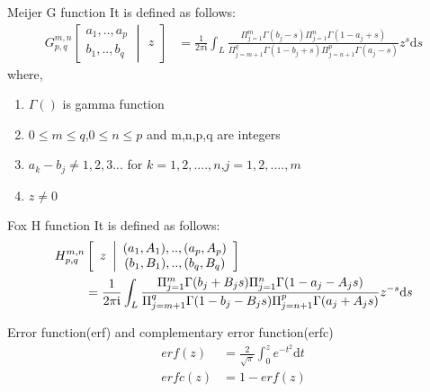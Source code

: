 \documentclass{beamer}
\providecommand{\sbrak}[1]{\ensuremath{{}\left[#1\right]}}
\begin{document}
\begin{frame}
\begin{block}{Meijer G function}
It is defined as follows:
\begin{align}
G^{m,n}_{p,q} \sbrak{\begin{array}{c}
a_1,..,a_p \\
b_1,..,b_q 
\end{array} \middle \vert
\begin{array}{c}
z
\end{array} } &= \frac{1}{2 \pi \mathfrak{i}} \int_L \frac{\Pi_{j=1}^m \Gamma(b_j-s)\Pi_{j=1}^n \Gamma(1-a_j+s)}{\Pi_{j=m+1}^q \Gamma(1-b_j+s)\Pi_{j=n+1}^p \Gamma(a_j-s)} z^s \mathrm{d}s \label{g}
\end{align}
where,
\begin{enumerate}
\item $\Gamma()$ is gamma function
\item $0 \leq m \leq q$,$0 \leq n \leq p$ and m,n,p,q are integers
\item $a_k-b_j \neq 1,2,3...$ for $k=1,2,....,n$,$j=1,2,....,m$
\item $z \neq 0$
\end{enumerate}
\end{block}
\end{frame}




\begin{frame}
\begin{block}{Fox H function}
It is defined as follows:
\begin{align}
H^{m,n}_{p,q} & \sbrak{\begin{array}{c}
z
\end{array} \middle \vert
\begin{array}{c}
(a_1,A_1),..,(a_p,A_p) \\
(b_1,B_1),..,(b_q,B_q) 
\end{array} }   \notag \\ 
 &= \frac{1}{2 \pi \mathfrak{i}} \int_L \frac{\Pi_{j=1}^m \Gamma(b_j+B_js)\Pi_{j=1}^n \Gamma(1-a_j-A_js)}{\Pi_{j=m+1}^q \Gamma(1-b_j-B_js)\Pi_{j=n+1}^p \Gamma(a_j+A_js)} z^{-s} \mathrm{d}s \label{f}
\end{align}
\end{block}
\begin{block}{Error function(erf) and complementary error function(erfc)}
\begin{align}
erf(z) &= \frac{2}{\sqrt{\pi}} \int_0^z e^{-t^2} \mathrm{d}t \label{erf} \\
erfc(z) &= 1- erf(z) \label{erfc}
\end{align}
\end{block}
\end{frame}
\end{document}
